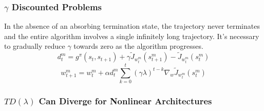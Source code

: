 \subsubsection*{$ \gamma $ Discounted Problems}%
In the absence of an absorbing termination state, the trajectory never terminates and the entire algorithm involves a single infinitely long trajectory.
It's necessary to gradually reduce $ \gamma $ towards zero as the algorithm progresses.
\[
    d^m_t = g^{\pi}(s_t, s_{t+1}) + \gamma \tilde J_{w^m_{t}} (s^m_{t+1}) - \tilde J_{w^m_{t}} (s^m_{t})
\]
\[
    w^{m}_{t+1} = w^{m}_{t} + \alpha d^m_t \sum^{t}_{k = 0} {(\gamma\lambda)}^{t - k} \nabla_w \tilde J_{w^{m}_{t}}(s^{m}_{t})
\]

\subsubsection*{$ TD(\lambda) $ Can Diverge for Nonlinear Architectures}%

